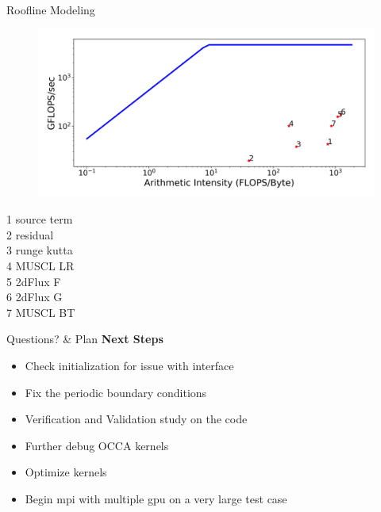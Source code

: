 \begin{frame}[t]{Roofline Modeling}
  \minipage{\textwidth}
  \begin{figure}[!htbp]
   \includegraphics[width=1.0\linewidth]{fig/rooflinemodeling}
   \centering
  \end{figure}

  \endminipage\hfill
    1 source term \\
    2 residual\\
    3 runge kutta\\
    4 MUSCL LR\\
    5 2dFlux F\\
    6 2dFlux G\\
    7 MUSCL BT
  \endminipage\hfill
  \endminipage


  \vspace{0.5cm}
\end{frame}

\begin{frame}[t,fragile]{Questions? \& Plan}
  \textbf{Next Steps}
  \begin{itemize}
    \item Check initialization for issue with interface 
    \item Fix the periodic boundary conditions
    \item Verification and Validation study on the code
    \item Further debug OCCA kernels
    \item Optimize kernels
    \item Begin mpi with multiple gpu on a very large test case
  \end{itemize}
\end{frame}

\backupbegin

